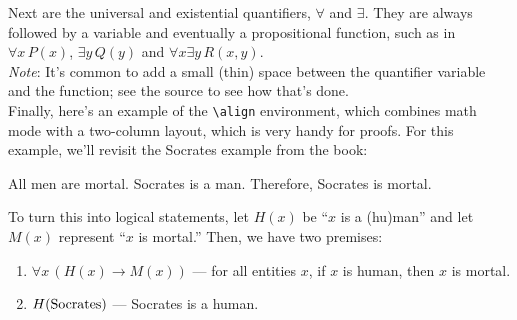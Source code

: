 \documentclass{article}
\begin{document}
Next are the universal and existential quantifiers, $\forall$ and $\exists$.
They are always followed by a variable and eventually a propositional function,
such as in $\forall x\,P(x)$, $\exists y\,Q(y)$ and $\forall x\exists y\,
R(x,y)$.\\
\emph{Note}\/: It's common to add a small (thin) space between the quantifier
variable and the function; see the source to see how that's done.\\

Finally, here's an example of the {\tt \textbackslash align} environment, which
combines math mode with a two-column layout, which is very handy for proofs. For
this example, we'll revisit the Socrates example from the book:
\begin{center}
  All men are mortal. Socrates is a man. Therefore, Socrates is mortal.
\end{center}

To turn this into logical statements, let $H(x)$ be ``$x$ is a (hu)man'' and let
$M(x)$ represent ``$x$ is mortal.'' Then, we have two premises:
\begin{enumerate}
  \item $\forall x\,(H(x)\to M(x))$ --- for all entities $x$, if $x$ is human,
  then $x$ is mortal.
  \item $H({\rm Socrates})$ --- Socrates is a human.
\end{enumerate}
\end{document}
